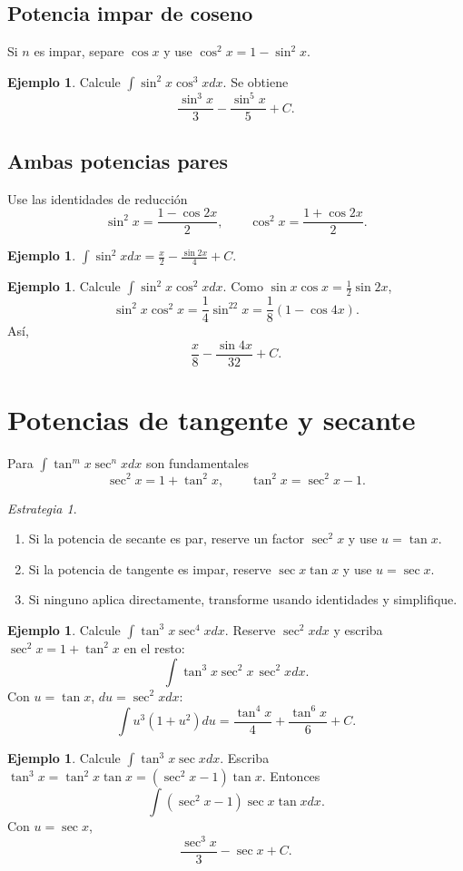 \documentclass[12pt]{article}
\theoremstyle{definition}
\newtheorem{ejemplo}[teorema]{Ejemplo}
\theoremstyle{remark}
\newtheorem*{estrategia}{Estrategia}
\begin{document}
\subsection*{Potencia impar de coseno}
Si $n$ es impar, separe $\cos x$ y use $\cos^2x=1-\sin^2x$.
\begin{ejemplo}Calcule $\int\sin^2x\cos^3x dx$. Se obtiene\[\boxed{\frac{\sin^3x}{3}-\frac{\sin^5x}{5}+C}.\]\end{ejemplo}
\subsection*{Ambas potencias pares}
Use las identidades de reducción
\[\sin^2x=\frac{1-\cos2x}{2},\qquad\cos^2x=\frac{1+\cos2x}{2}.\]
\begin{ejemplo}$\int\sin^2x dx=\boxed{\frac{x}{2}-\frac{\sin2x}{4}+C}$.\end{ejemplo}
\begin{ejemplo}Calcule $\int\sin^2x\cos^2x dx$. Como $\sin x\cos x=\frac12\sin2x$,
\[\sin^2x\cos^2x=\frac14\sin^22x=\frac18(1-\cos4x).\]
Así,
\[\boxed{\frac{x}{8}-\frac{\sin4x}{32}+C}.\]\end{ejemplo}

\section{Potencias de tangente y secante}
Para $\int\tan^m x\sec^n xdx$ son fundamentales
\[\sec^2x=1+\tan^2x,\qquad \tan^2x=\sec^2x-1.\]
\begin{estrategia}
\begin{enumerate}
\item Si la potencia de secante es par, reserve un factor $\sec^2x$ y use $u=\tan x$.
\item Si la potencia de tangente es impar, reserve $\sec x\tan x$ y use $u=\sec x$.
\item Si ninguno aplica directamente, transforme usando identidades y simplifique.
\end{enumerate}
\end{estrategia}
\begin{ejemplo}Calcule $\int\tan^3x\sec^4x dx$. Reserve $\sec^2x dx$ y escriba $\sec^2x=1+\tan^2x$ en el resto:
\[\int\tan^3x\sec^2x\,\sec^2x dx.\]
Con $u=\tan x$, $du=\sec^2x dx$:
\[\int u^3(1+u^2)du=\boxed{\frac{\tan^4x}{4}+\frac{\tan^6x}{6}+C}.\]\end{ejemplo}
\begin{ejemplo}Calcule $\int\tan^3x\sec xdx$. Escriba $\tan^3x=\tan^2x\tan x=(\sec^2x-1)\tan x$. Entonces
\[\int(\sec^2x-1)\sec x\tan xdx.\]
Con $u=\sec x$,
\[\boxed{\frac{\sec^3x}{3}-\sec x+C}.\]\end{ejemplo}
\end{document}

